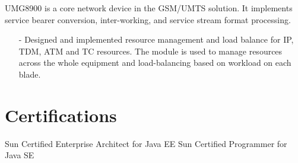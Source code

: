 \documentclass[10pt,a4paper]{moderncv}
\begin{document}
{
  UMG8900  is a core network device in the GSM/UMTS solution. It implements service bearer conversion, inter-working,  and service stream format processing.
  \begin{itemize}
    \item[-] Designed and implemented resource management and load balance for IP, TDM, ATM and TC resources. The module  is used to manage resources across the whole equipment and load-balancing based on workload on each blade.
  \end{itemize}
}


\vspace*{0.4\baselineskip}

\section{Certifications}
{Sun Certified Enterprise Architect for Java EE }{}{}{}{}
\vspace*{0.4\baselineskip}
{Sun Certified Programmer for Java SE }{}{}{}{}

\end{document}
